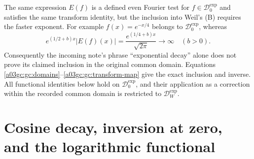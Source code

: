 \documentclass[11pt,a4paper]{article}
\begin{document}
The same expression $E(f)$ is a defined even Fourier test for
$f\in\mathcal D_0^{\exp}$ and satisfies the same transform identity,
but the inclusion into Weil's (B) requires the faster exponent.
For example $f(x)=e^{-x/4}$ belongs to $\mathcal D_0^{\exp}$, whereas
\begin{equation}
 e^{(1/2+b)x}|E(f)(x)|
   =\frac{e^{(1/4+b)x}}{\sqrt{2\pi}}\longrightarrow\infty
   \quad (b>0).
 \label{a03gc:gc:domain-counterexample}
\end{equation}
Consequently the incoming note's phrase ``exponential decay'' alone does
not prove its claimed inclusion in the original common domain.  Equations
\eqref{a03gc:gc:domains}--\eqref{a03gc:gc:transform-map} give the exact inclusion and
inverse.  All functional identities below hold on
$\mathcal D_0^{\exp}$, and their application as a correction within the
recorded common domain is restricted to $\mathcal D_W^{\exp}$.

\section{Cosine decay, inversion at zero, and the logarithmic functional}
\end{document}
